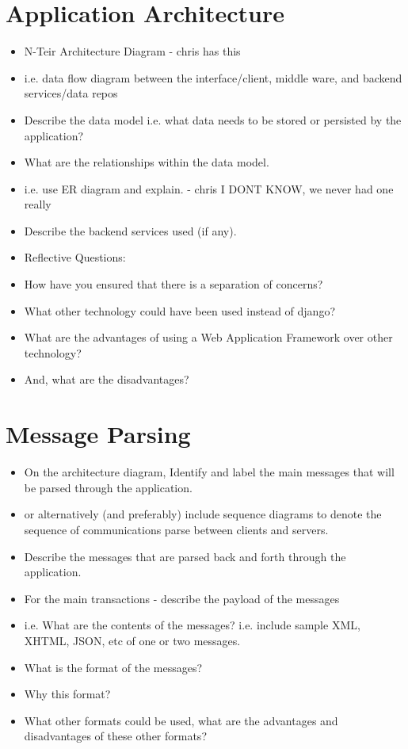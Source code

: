 \documentclass{sig-alt-release2}
\begin{document}
\section{Application Architecture}
\begin{itemize}

\item	N-Teir Architecture Diagram - chris has this

\item	i.e. data flow diagram between the interface/client, middle ware, and backend services/data repos

\item	Describe the data model i.e. what data needs to be stored or persisted by the application?

\item	What are the relationships within the data model.
\item	i.e. use ER diagram and explain. - chris I DONT KNOW, we never had one really

\item	Describe the backend services used (if any).

\item	Reflective Questions: 
\item	How have you ensured that there is a separation of concerns? 
\item	What other technology could have been used instead of django? 
\item	What are the advantages of using a Web Application Framework over other technology? 
\item	And, what are the disadvantages?
\end{itemize}

\section{Message Parsing}
\begin{itemize}

\item	On the architecture diagram, Identify and label the main messages that will be parsed through the application.
\item	or alternatively (and preferably) include sequence diagrams to denote the sequence of communications parse between clients and servers.

\item	Describe the messages that are parsed back and forth through the application.

\item	For the main transactions - describe the payload of the messages 
\item	i.e. What are the contents of the messages? i.e. include sample XML, XHTML, JSON, etc of one or two messages.

\item	What is the format of the messages? 

\item	Why this format? 

\item	What other formats could be used, what are the advantages and disadvantages of these other formats?
\end{itemize}
\end{document}
